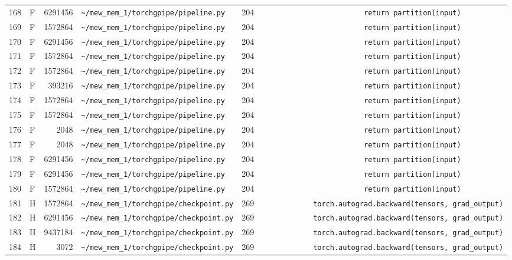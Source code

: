 \documentclass{article}
\begin{document}
\begin{longtable}{r l r p{6.5cm} r p{7.0cm}}
168 & F & 6291456 & \lstinline|~/mew_mem_1/torchgpipe/pipeline.py| & 204 & \lstinline|                        return partition(input)| \\
169 & F & 1572864 & \lstinline|~/mew_mem_1/torchgpipe/pipeline.py| & 204 & \lstinline|                        return partition(input)| \\
170 & F & 6291456 & \lstinline|~/mew_mem_1/torchgpipe/pipeline.py| & 204 & \lstinline|                        return partition(input)| \\
171 & F & 1572864 & \lstinline|~/mew_mem_1/torchgpipe/pipeline.py| & 204 & \lstinline|                        return partition(input)| \\
172 & F & 1572864 & \lstinline|~/mew_mem_1/torchgpipe/pipeline.py| & 204 & \lstinline|                        return partition(input)| \\
173 & F & 393216 & \lstinline|~/mew_mem_1/torchgpipe/pipeline.py| & 204 & \lstinline|                        return partition(input)| \\
174 & F & 1572864 & \lstinline|~/mew_mem_1/torchgpipe/pipeline.py| & 204 & \lstinline|                        return partition(input)| \\
175 & F & 1572864 & \lstinline|~/mew_mem_1/torchgpipe/pipeline.py| & 204 & \lstinline|                        return partition(input)| \\
176 & F & 2048 & \lstinline|~/mew_mem_1/torchgpipe/pipeline.py| & 204 & \lstinline|                        return partition(input)| \\
177 & F & 2048 & \lstinline|~/mew_mem_1/torchgpipe/pipeline.py| & 204 & \lstinline|                        return partition(input)| \\
178 & F & 6291456 & \lstinline|~/mew_mem_1/torchgpipe/pipeline.py| & 204 & \lstinline|                        return partition(input)| \\
179 & F & 6291456 & \lstinline|~/mew_mem_1/torchgpipe/pipeline.py| & 204 & \lstinline|                        return partition(input)| \\
180 & F & 1572864 & \lstinline|~/mew_mem_1/torchgpipe/pipeline.py| & 204 & \lstinline|                        return partition(input)| \\
181 & H & 1572864 & \lstinline|~/mew_mem_1/torchgpipe/checkpoint.py| & 269 & \lstinline|            torch.autograd.backward(tensors, grad_output)| \\
182 & H & 6291456 & \lstinline|~/mew_mem_1/torchgpipe/checkpoint.py| & 269 & \lstinline|            torch.autograd.backward(tensors, grad_output)| \\
183 & H & 9437184 & \lstinline|~/mew_mem_1/torchgpipe/checkpoint.py| & 269 & \lstinline|            torch.autograd.backward(tensors, grad_output)| \\
184 & H & 3072 & \lstinline|~/mew_mem_1/torchgpipe/checkpoint.py| & 269 & \lstinline|            torch.autograd.backward(tensors, grad_output)| \\
\end{longtable}
\end{document}

